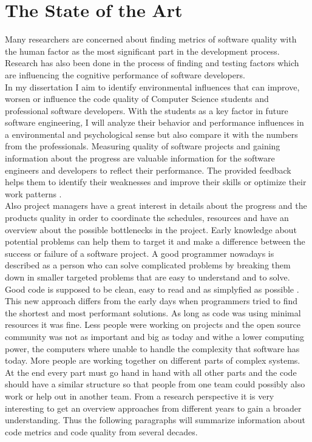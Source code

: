 \chapter{The State of the Art}

Many researchers are concerned about finding metrics of software quality with the human factor as the most significant part in the development process. Research has also been done in the process of finding and testing factors which are influencing the cognitive performance of software developers.\\
In my dissertation I aim to identify environmental influences that can improve, worsen or influence the code quality of Computer Science students and professional software developers.
With the students as a key factor in future software engineering, I will analyze their behavior and performance influences in a environmental and psychological sense but also compare it with the numbers from the professionals. \cite{denissen2008effects}
\bigbreak
Measuring quality of software projects and gaining information about the progress are valuable information for the software engineers and developers to reflect their performance. The provided feedback helps them to identify their weaknesses and improve their skills or optimize their work patterns \cite{johnson1999leap} \cite{Martin:2008:CCH:1388398}.\\
Also project managers have a great interest in details about the progress and the products quality in order to coordinate the schedules, resources and have an overview about the possible bottlenecks in the project.
Early knowledge about potential problems can help them to target it and make a difference between the success or failure of a software project.
\bigbreak
A good programmer nowadays is described as a person who can solve complicated problems by breaking them down in smaller targeted problems that are easy to understand and to solve. Good code is supposed to be clean, easy to read and as simplyfied as possible \cite{johnson1999leap}.
\\
This new approach differs from the early days when programmers tried to find the shortest and most performant solutions. As long as code was using minimal resources it was fine. Less people were working on projects and the open source community was not as important and big as today and withe a lower computing power, the computers where unable to handle the complexity that software has today. 
More people are working together on different parts of complex systems. At the end every part must go hand in hand with all other parts and the code should have a similar structure so that people from one team could possibly also work or help out in another team.
\bigbreak
From a research perspective it is very interesting to get an overview approaches from different years to gain a broader understanding. Thus the following paragraphs will summarize information about code metrics and code quality from several decades.

